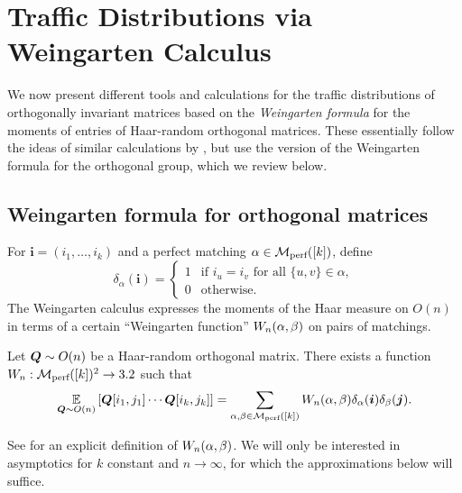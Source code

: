 

\section{Traffic Distributions via Weingarten Calculus}
\label{app:weingarten}

We now present different tools and calculations for the traffic distributions of orthogonally invariant matrices based on the \emph{Weingarten formula} for the moments of entries of Haar-random orthogonal matrices.
These essentially follow the ideas of similar calculations by \cite{cebron2024traffic}, but use the version of the Weingarten formula for the orthogonal group, which we review below.

\subsection{Weingarten formula for orthogonal matrices}

For $\bm i = (i_1, \dots, i_k)$ and a perfect matching $\alpha \in \mathcal{M}_{\textnormal{perf}}([k])$, define
\[ \delta_{\alpha}(\bm i) = \begin{cases} 1 & \text{if } i_u = i_v \text{ for all } \{u, v\} \in \alpha, \\ 0 & \text{otherwise.} \end{cases} \]
The Weingarten calculus expresses the moments of the Haar measure on $O(n)$ in terms of a certain ``Weingarten function'' $W_n(\alpha, \beta)$ on pairs of matchings.

\begin{lemma}
    Let ${\bm Q} \sim O(n)$ be a Haar-random orthogonal matrix. There exists a function $W_n: \mathcal{M}_{\textnormal{perf}}([k])^2 \to 3.2$ such that
    \[
        \operatorname*{\mathbb{E}}_{{\bm Q} \sim O(n)} \left[{\bm Q}[i_1,j_1]\cdots {\bm Q}[i_k,j_k]\right] = \sum_{\alpha, \beta \in \mathcal{M}_{\textnormal{perf}}([k])} W_n(\alpha, \beta) \delta_{\alpha}(\bm i) \delta_{\beta}(\bm j).
    \]
\end{lemma}
\noindent
See \cite{CS-2006-HaarMeasureMoments,Banica-2010-OrthogonalWeingartenFormula} for an explicit definition of $W_n(\alpha, \beta)$.
We will only be interested in asymptotics for $k$ constant and $n \to \infty$, for which the approximations below will suffice.

